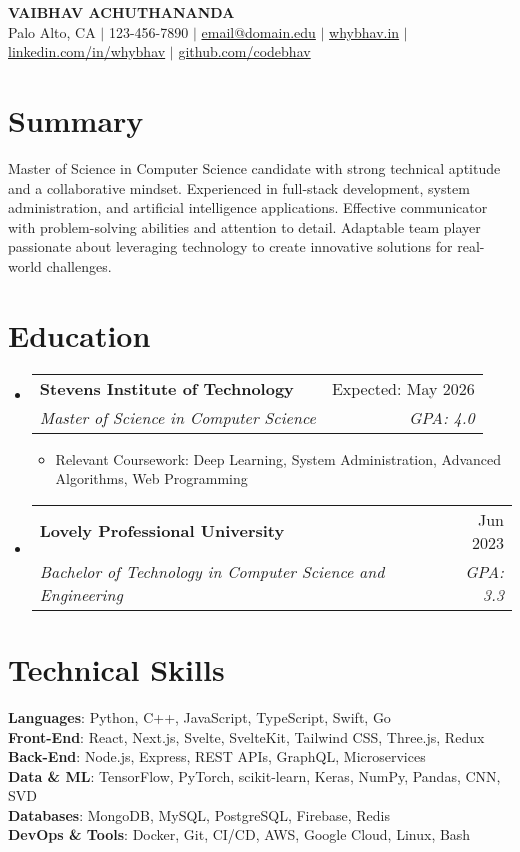 \documentclass[letterpaper,11pt]{article}
\makeatletter
\newcommand{\resumeItem}[1]{
  \item\small{
    {#1 \vspace{-2pt}}
  }
}
\newcommand{\resumeSubheading}[4]{
    \item
    \begin{tabular*}{\textwidth}[t]{l@{\extracolsep{\fill}}r}
      \textbf{#1} & #2 \\
      \textit{\small#3} & \textit{\small #4} \\
    \end{tabular*}\vspace{-7pt}
}
\newcommand{\resumeSubHeadingListStart}{\begin{itemize}[leftmargin=0in, label={}]}
\newcommand{\resumeSubHeadingListEnd}{\end{itemize}}
\newcommand{\resumeItemListStart}{\begin{itemize}}
\newcommand{\resumeItemListEnd}{\end{itemize}\vspace{-5pt}}
\makeatother
\begin{document}
\begin{center}
    \textbf{\LARGE VAIBHAV ACHUTHANANDA} \\ \vspace{1pt}
    \small 
    Palo Alto, CA $|$ 
    123-456-7890 $|$ 
    \href{mailto:email@domain.edu}{email@domain.edu} $|$
    \href{https://whybhav.in/}{whybhav.in} $|$
    \href{https://www.linkedin.com/in/whybhav}{linkedin.com/in/whybhav} $|$
    \href{https://github.com/codebhav}{github.com/codebhav}
\end{center}

\section{Summary}
\small{
Master of Science in Computer Science candidate with strong technical aptitude and a collaborative mindset. Experienced in full-stack development, system administration, and artificial intelligence applications. Effective communicator with problem-solving abilities and attention to detail. Adaptable team player passionate about leveraging technology to create innovative solutions for real-world challenges.
}

\section{Education}
  \resumeSubHeadingListStart
    \resumeSubheading
      {Stevens Institute of Technology}{Expected: May 2026}
      {Master of Science in Computer Science}{GPA: 4.0}
      \resumeItemListStart
        \resumeItem{Relevant Coursework: Deep Learning, System Administration, Advanced Algorithms, Web Programming}
      \resumeItemListEnd
      
    \resumeSubheading
      {Lovely Professional University}{Jun 2023}
      {Bachelor of Technology in Computer Science and Engineering}{GPA: 3.3}
  \resumeSubHeadingListEnd

\section{Technical Skills}
  \begin{itemize}[leftmargin=0in, label={}]
    \small{\item{
      \textbf{Languages}{: Python, C++, JavaScript, TypeScript, Swift, Go} \\
      \textbf{Front-End}{: React, Next.js, Svelte, SvelteKit, Tailwind CSS, Three.js, Redux} \\
      \textbf{Back-End}{: Node.js, Express, REST APIs, GraphQL, Microservices} \\
      \textbf{Data \& ML}{: TensorFlow, PyTorch, scikit-learn, Keras, NumPy, Pandas, CNN, SVD} \\
      \textbf{Databases}{: MongoDB, MySQL, PostgreSQL, Firebase, Redis} \\
      \textbf{DevOps \& Tools}{: Docker, Git, CI/CD, AWS, Google Cloud, Linux, Bash} \\
    }}
  \end{itemize}
\end{document}
